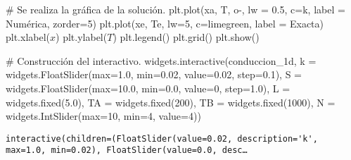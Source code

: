 \documentclass[
  letterpaper,
  DIV=11,
  numbers=noendperiod]{scrreprt}
\newenvironment{Shaded}{\begin{snugshade}}{\end{snugshade}}
\newcommand{\BuiltInTok}[1]{\textcolor[rgb]{0.00,0.23,0.31}{#1}}
\newcommand{\CommentTok}[1]{\textcolor[rgb]{0.37,0.37,0.37}{#1}}
\newcommand{\DecValTok}[1]{\textcolor[rgb]{0.68,0.00,0.00}{#1}}
\newcommand{\FloatTok}[1]{\textcolor[rgb]{0.68,0.00,0.00}{#1}}
\newcommand{\NormalTok}[1]{\textcolor[rgb]{0.00,0.23,0.31}{#1}}
\newcommand{\OperatorTok}[1]{\textcolor[rgb]{0.37,0.37,0.37}{#1}}
\newcommand{\StringTok}[1]{\textcolor[rgb]{0.13,0.47,0.30}{#1}}
\begin{document}
\begin{Shaded}
\begin{Highlighting}[]
    \CommentTok{\# Se realiza la gráfica de la solución.}
\NormalTok{    plt.plot(xa, T, }\StringTok{\textquotesingle{}o{-}\textquotesingle{}}\NormalTok{, lw }\OperatorTok{=} \FloatTok{0.5}\NormalTok{, c}\OperatorTok{=}\StringTok{\textquotesingle{}k\textquotesingle{}}\NormalTok{, label }\OperatorTok{=} \StringTok{\textquotesingle{}Numérica\textquotesingle{}}\NormalTok{, zorder}\OperatorTok{=}\DecValTok{5}\NormalTok{)}
\NormalTok{    plt.plot(xe, Te, lw}\OperatorTok{=}\DecValTok{5}\NormalTok{, c}\OperatorTok{=}\StringTok{\textquotesingle{}limegreen\textquotesingle{}}\NormalTok{, label }\OperatorTok{=} \StringTok{\textquotesingle{}Exacta\textquotesingle{}}\NormalTok{)}
\NormalTok{    plt.xlabel(}\StringTok{\textquotesingle{}$x$\textquotesingle{}}\NormalTok{)}
\NormalTok{    plt.ylabel(}\StringTok{\textquotesingle{}$T$\textquotesingle{}}\NormalTok{)}
\NormalTok{    plt.legend()}
\NormalTok{    plt.grid()}
\NormalTok{    plt.show()}
    
\CommentTok{\# Construcción del interactivo.}
\NormalTok{widgets.interactive(conduccion\_1d,}
\NormalTok{                    k }\OperatorTok{=}\NormalTok{ widgets.FloatSlider(}\BuiltInTok{max}\OperatorTok{=}\FloatTok{1.0}\NormalTok{, }\BuiltInTok{min}\OperatorTok{=}\FloatTok{0.02}\NormalTok{, value}\OperatorTok{=}\FloatTok{0.02}\NormalTok{, step}\OperatorTok{=}\FloatTok{0.1}\NormalTok{), }
\NormalTok{                    S }\OperatorTok{=}\NormalTok{ widgets.FloatSlider(}\BuiltInTok{max}\OperatorTok{=}\FloatTok{10.0}\NormalTok{, }\BuiltInTok{min}\OperatorTok{=}\FloatTok{0.0}\NormalTok{, value}\OperatorTok{=}\DecValTok{0}\NormalTok{, step}\OperatorTok{=}\FloatTok{1.0}\NormalTok{), }
\NormalTok{                    L }\OperatorTok{=}\NormalTok{ widgets.fixed(}\FloatTok{5.0}\NormalTok{), }
\NormalTok{                    TA }\OperatorTok{=}\NormalTok{ widgets.fixed(}\DecValTok{200}\NormalTok{), }
\NormalTok{                    TB }\OperatorTok{=}\NormalTok{ widgets.fixed(}\DecValTok{1000}\NormalTok{), }
\NormalTok{                    N }\OperatorTok{=}\NormalTok{ widgets.IntSlider(}\BuiltInTok{max}\OperatorTok{=}\DecValTok{10}\NormalTok{, }\BuiltInTok{min}\OperatorTok{=}\DecValTok{4}\NormalTok{, value}\OperatorTok{=}\DecValTok{4}\NormalTok{))}
\end{Highlighting}
\end{Shaded}

\begin{verbatim}
interactive(children=(FloatSlider(value=0.02, description='k', max=1.0, min=0.02), FloatSlider(value=0.0, desc…
\end{verbatim}
\end{document}
